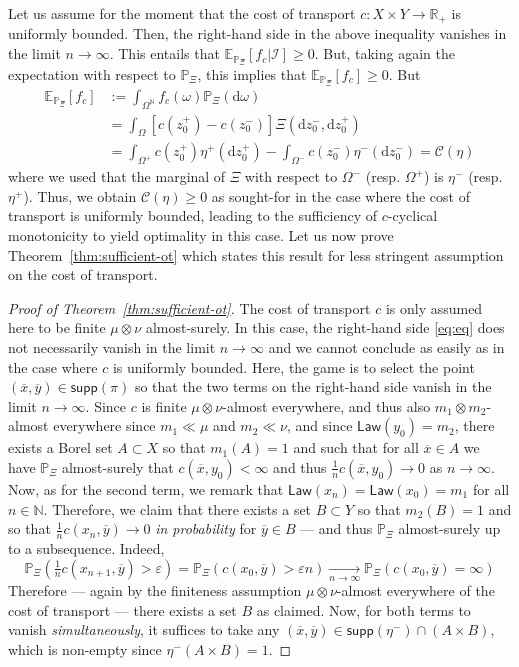 \documentclass[leqno, 11pt, a4paper]{amsart}
\theoremstyle{definition}
\newcommand{\R}{\mathbb{R}}
\newcommand{\C}{\mathscr{C}}
\newcommand{\E}{\mathbb{E}}
\newcommand{\N}{\mathbb{N}}
\newcommand{\Pro}{\mathbb{P}}
\newcommand{\eps}{\varepsilon}
\newcommand{\supp}{\textsf{supp}}
\newcommand{\ox}{\overline{x}}
\newcommand{\oy}{\overline{y}}
\newcommand{\law}{\textsf{Law}}
\newcommand{\dd}{\mathrm{d}}
\begin{document}
Let us assume for the moment that the cost of transport $c : X \times Y \to \R_+$ is uniformly bounded. Then, the right-hand side in the above inequality vanishes in the limit $n \to \infty$. This entails that $\E_{\Pro_\Xi}[f_c | \mathcal{I}] \geq 0$. But, taking again the expectation with respect to $\Pro_\Xi$, this implies that $\E_{\Pro_\Xi}[f_c] \geq 0$. But
\begin{align*}
\E_{\Pro_\Xi}[f_c] &:= \int_{\Omega^\N} f_c(\omega)  \Pro_\Xi(\dd\omega) \\
&= \int_{\Omega} [c(z_0^+) - c(z_0^-)]  \Xi(\dd z_0^-, \dd z_0^+) \\
&= \int_{\Omega^+} c(z^+_0) \eta^+(\dd z^+_0) -\int_{\Omega^-} c(z^-_0) \eta^-(\dd z^-_0) = \C(\eta) 
\end{align*}
where we used that the marginal of $\Xi$ with respect to $\Omega^-$ (resp. $\Omega^+$) is $\eta^-$ (resp. $\eta^+$). Thus, we obtain $\C(\eta) \geq 0$ as sought-for in the case where the cost of transport is uniformly bounded, leading to the sufficiency of $c$-cyclical monotonicity to yield optimality in this case. Let us now prove Theorem~\ref{thm:sufficient-ot} which states this result for less stringent assumption on the cost of transport.

	\begin{proof}[Proof of Theorem~\ref{thm:sufficient-ot}]
		The cost of transport $c$ is only assumed here to be finite $\mu \otimes \nu$ almost-surely. In this case, the right-hand side \eqref{eq:eq} does not necessarily vanish in the limit $n \to \infty$ and we cannot conclude as easily as in the case where $c$ is uniformly bounded. Here, the game is to select the point $(\overline{x}, \overline{y}) \in \supp(\pi)$ so that the two terms on the right-hand side vanish in the limit $n \to \infty$. Since $c$ is finite $\mu \otimes \nu$-almost everywhere, and thus also $m_1 \otimes m_2$-almost everywhere since $m_1 \ll \mu$ and $m_2 \ll \nu$, and since $\law(y_0) = m_2$, there exists a Borel set $A \subset X$ so that $m_1(A) = 1$ and such that for all $\ox \in A$ we have $\Pro_\Xi$ almost-surely that $c(\ox, y_0) < \infty$ and thus $\tfrac1n  c(\ox, y_0) \to 0$ as $n \to \infty$. Now, as for the second term, we remark that $\law(x_n) = \law(x_0) = m_1$ for all $n \in \N$. Therefore, we claim that there exists a set $B \subset Y$ so that $m_2(B) = 1$ and so that $\tfrac1n c(x_{n},\oy) \to 0$ \textit{in probability} for $\oy \in B$ — and thus $\Pro_\Xi$ almost-surely up to a subsequence. Indeed,
		$$
		\Pro_\Xi(\tfrac1n c(x_{n+1},\oy) > \eps) = \Pro_\Xi(c(x_0, \oy) > \eps n) \xrightarrow[n \to \infty]{} \Pro_{\Xi}(c(x_0, \oy) = \infty)
		$$
		Therefore — again by the finiteness assumption $\mu \otimes \nu$-almost everywhere of the cost of transport — there exists a set $B$ as claimed. Now, for both terms to vanish \textit{simultaneously}, it suffices to take any $(\ox, \oy) \in \supp(\eta^-) \cap (A \times B)$, which is non-empty since $\eta^-(A \times B) = 1$.
	\end{proof}
\end{document}

